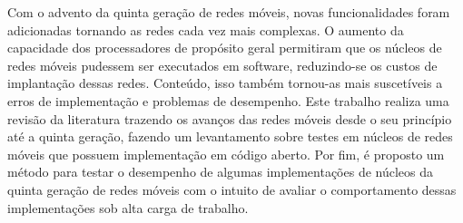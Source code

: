 Com o advento da quinta geração de redes móveis, novas funcionalidades foram adicionadas tornando as redes cada vez mais complexas.
O aumento da capacidade dos processadores de propósito geral permitiram que os núcleos de redes móveis pudessem ser executados em software, reduzindo-se os custos de implantação dessas redes. Conteúdo, isso também tornou-as mais suscetíveis a erros de implementação e problemas de desempenho.
Este trabalho realiza uma revisão da literatura trazendo os avanços das redes móveis desde o seu princípio até a quinta geração, fazendo um levantamento sobre testes em núcleos de redes móveis que possuem implementação em código aberto.
Por fim, é proposto um método para testar o desempenho de algumas implementações de núcleos da quinta geração de redes móveis com o intuito de avaliar o comportamento dessas implementações sob alta carga de trabalho.
